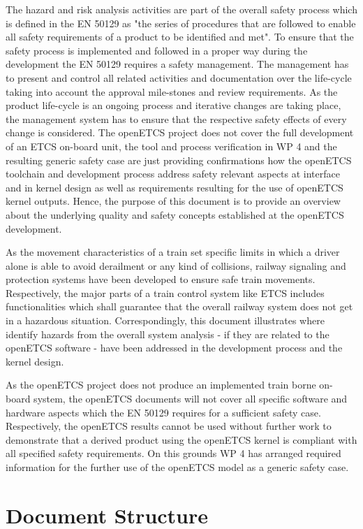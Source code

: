 \documentclass{template/openetcs_report}
\begin{document}
The hazard and risk analysis activities are part of the overall safety process which is defined in the EN 50129 as "the series of procedures that are followed to enable all safety requirements of a product to be identified and met". To ensure that the safety process is implemented and followed in a proper way during the development the EN 50129 requires a safety management. The management has to present and control all related activities and documentation over the life-cycle taking into account the approval mile-stones and review requirements. As the product life-cycle is an ongoing process and iterative changes are taking place, the management system has to ensure that the respective safety effects of every change is considered. The openETCS project does not cover the full development of an ETCS on-board unit, the tool and process verification in WP 4 and the resulting generic safety case are just providing confirmations how the openETCS toolchain and development process address safety relevant aspects at interface and in kernel design as well as requirements resulting for the use of openETCS kernel outputs. Hence, the purpose of this document is to provide an overview about the underlying quality and safety concepts established at the openETCS development.

As the movement characteristics of a train set specific limits in which a driver alone is able to avoid derailment or any kind of collisions, railway signaling and protection systems have been developed to ensure safe train movements. Respectively, the major parts of a train control system like ETCS includes functionalities which shall guarantee that the overall railway system does not get in a hazardous situation. Correspondingly, this document illustrates where identify hazards from the overall system analysis - if they are related to the openETCS software -  have been addressed in the development process and the kernel design. 

As the openETCS project does not produce an implemented train borne on-board system, the openETCS documents will not cover all specific software and hardware aspects which the EN 50129 requires for a sufficient safety case. Respectively, the openETCS results cannot be used without further work to demonstrate that a derived product using the openETCS kernel is compliant with all specified safety requirements. On this grounds WP 4 has arranged required information for the further use of the openETCS model as a generic safety case.

\section{Document Structure}
\label{sec:document-structure}
\end{document}
